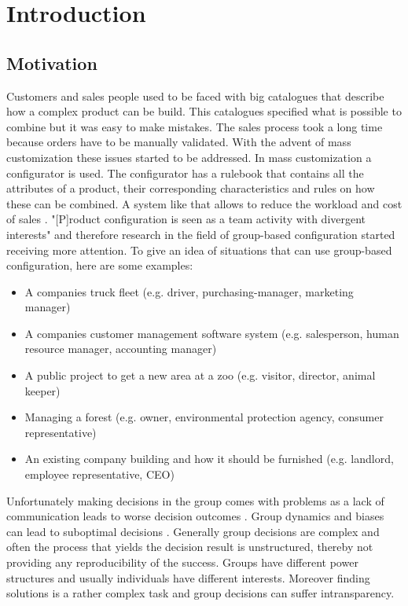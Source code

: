 \chapter{Introduction}
\label{ch:Introduction}

\section{Motivation}
\label{sec:Introduction:Goals}

Customers and sales people used to be faced with big catalogues that describe how a complex product can be build. This catalogues specified what is possible to combine but it was easy to make mistakes. The sales process took a long time because orders have to be manually validated. With the advent of mass customization these issues started to be addressed. In mass customization a configurator is used. The configurator has a rulebook that contains all the attributes of a product, their corresponding characteristics and rules on how these can be combined. A system like that allows to reduce the workload and cost of sales \cite{shafieeCostBenefitAnalysis2018}. "[P]roduct configuration is seen as a team activity with divergent interests" \cite{mendoncaCollaborativeProductConfiguration2008} and therefore research in the field of group-based configuration started receiving more attention. 
To give an idea of situations that can use group-based configuration, here are some examples:
\begin{itemize}
    \item A companies truck fleet (e.g. driver, purchasing-manager, marketing manager)
    \item A companies customer management software system (e.g. salesperson, human resource manager, accounting manager)
    \item A public project to get a new area at a zoo (e.g. visitor, director, animal keeper)
    \item Managing a forest (e.g. owner, environmental protection agency, consumer representative)
    \item An existing company building and how it should be furnished (e.g. landlord, employee representative, CEO)
\end{itemize}

Unfortunately making decisions in the group comes with problems as a lack of communication leads to worse decision outcomes \cite{atasItemRecommendationUsing2017}. Group dynamics and biases can lead to suboptimal decisions \cite{kerrBiasJudgmentComparing1996}.
Generally group decisions are complex and often the process that yields the decision result is unstructured, thereby not providing any reproducibility of the success. Groups have different power structures and usually individuals have different interests. Moreover finding solutions is a rather complex task and group decisions can suffer intransparency.

